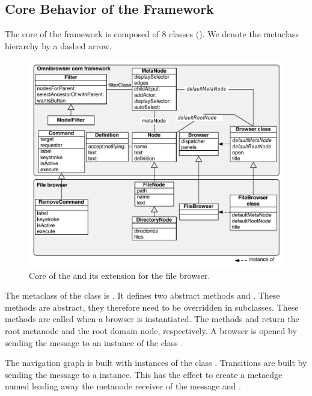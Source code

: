 \documentclass[a4paper,10pt,twoside]{book}
\begin{document}
\subsection{Core Behavior of the Framework}\label{sec:corebehavior}

The core of the \ob framework is composed of 8 classes (). We denote the \st metaclass hierarchy by a dashed arrow. 

\begin{figure}[!ht]
\begin{center}
\includegraphics[scale=0.52]{Core}
\caption{Core of the \obf and its extension for the file browser.} 
\end{center}
\end{figure}

The metaclass of the class  is . It defines two abstract methods  and . These methods are abstract, they therefore need to be overridden in subclasses. These methods are called when a browser is instantiated. The methods   and  return the root metanode and the root domain node, respectively. A browser is opened by sending the message  to an instance of the class .

The navigation graph is built with instances of the class . Transitions are built by sending the message  to a  instance. This has the effect to create a metaedge named  leading away the metanode receiver of the message and .
\end{document}
